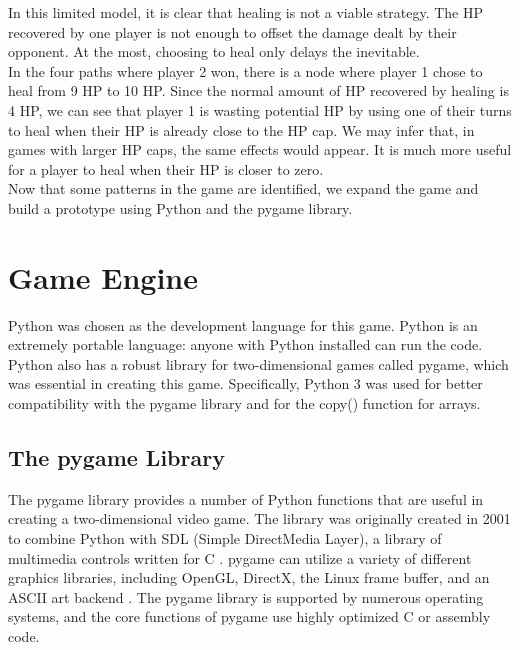 In this limited model, it is clear that healing is not a viable strategy. The HP recovered by one player is not enough to offset the damage dealt by their opponent. At the most, choosing to heal only delays the inevitable.\\

In the four paths where player 2 won, there is a node where player 1 chose to heal from 9 HP to 10 HP. Since the normal amount of HP recovered by healing is 4 HP, we can see that player 1 is wasting potential HP by using one of their turns to heal when their HP is already close to the HP cap. We may infer that, in games with larger HP caps, the same effects would appear. It is much more useful for a player to heal when their HP is closer to zero.\\

Now that some patterns in the game are identified, we expand the game and build a prototype using Python and the pygame library.

\section{Game Engine}
Python was chosen as the development language for this game. Python is an extremely portable language: anyone with Python installed can run the code. Python also has a robust library for two-dimensional games called pygame, which was essential in creating this game. Specifically, Python 3 was used for better compatibility with the pygame library and for the copy() function for arrays.

\subsection{The pygame Library}
The pygame library provides a number of Python functions that are useful in creating a two-dimensional video game. The library was originally created in 2001 to combine Python with SDL (Simple DirectMedia Layer), a library of multimedia controls written for C \cite{shinners}. pygame can utilize a variety of different graphics libraries, including OpenGL, DirectX, the Linux frame buffer, and an ASCII art backend \cite{shinners}. The pygame library is supported by numerous operating systems, and the core functions of pygame use highly optimized C or assembly code.\\

